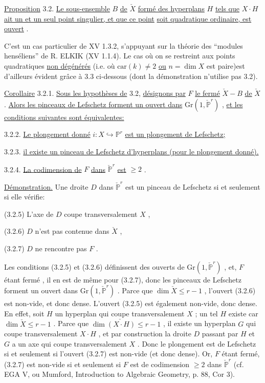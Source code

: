 \underline{Proposition} 3.2. \underline{Le sous-ensemble} $B$ \underline{de} $\check{X}$ \underline{formé des hyperplans} $H$ \underline{tels que} $X \cdot H$ \underline{ait un et un seul point singulier, et que ce point}
\underline{soit quadratique ordinaire, est ouvert} .

C'est un cas particulier de XV 1.3.2, s'appuyant sur la théorie des ``modules henséliens'' de R. ELKIK (XV 1.1.4). Le cas où on se restreint aux points quadratiques \underline{non dégénérés} (i.e. où $\mathrm{car}(k) \neq 2$ \underline{ou} $n=\dim X$ est paire)est d'ailleurs évident grâce à 3.3 ci-dessous (dont la démonstration n'utilise pas 3.2).

\underline{Corollaire} 3.2.1. \underline{Sous les hypothèses de} 3.2, \underline{désignons par} $F$ \underline{le fermé} $\check{X}-B$ \underline{de} $\check{X}$ . \underline{Alors les pinceaux de Lefschetz forment un ouvert dans} $\mathrm{Gr}(1, \check{\mathbb{P}}^r)$ , \underline{et les conditions suivantes sont équivalentes:}

3.2.2. \underline{Le plongement donné} $i : X \hookrightarrow \mathbb{P}^r$ \underline{est un plongement de Lefschetz;}

3.2.3. \underline{il existe un pinceau de Lefschetz d'hyperplans (pour le plongement donné).}

3.2.4. \underline{La codimension de} $F$ \underline{dans} $\check{\mathbb{P}}^r$ \underline{est} $\geq 2$ .

\underline{Démonstration.} Une droite $D$ dans $\check{\mathbb{P}}^r$ est un pinceau de Lefschetz si et seulement si elle vérifie:

(3.2.5) L'axe de $D$ coupe transversalement $X$ ,

(3.2.6) $D$ n'est pas contenue dans $\check{X}$ ,

(3.2.7) $D$ ne rencontre pas $F$ .



Les conditions (3.2.5) et (3.2.6) définissent des ouverts de $\mathrm{Gr}(1, \check{\mathbb{P}}^{r})$ , et, $F$ étant fermé , il en est de même pour (3.2.7), donc les pinceaux de Lefschetz forment un ouvert dans $\mathrm{Gr}(1, \check{\mathbb{P}}^{r})$ . Parce que $\dim \check{X} \leq r-1$ , l'ouvert (3.2.6) est non-vide, et donc dense. L'ouvert (3.2.5) est également non-vide, donc dense. En effet, soit $H$ un hyperplan qui coupe transversalement $X$ ; un tel $H$ existe car $\dim \check{X} \leq r-1$ . Parce que $\dim \check{(X \cdot H)} \leq r-1$ , il existe un hyperplan $G$ qui coupe transversalement $X \cdot H$ , et par construction la droite $D$ passant par $H$ et $G$ a un axe qui coupe transversalement $X$ . Donc le plongement est de Lefschetz si et seulement si l'ouvert (3.2.7) est non-vide (et donc dense). Or, $F$ étant fermé, (3.2.7) est non-vide si et seulement si $F$ est de codimension $\geq 2$ dans $\check{\mathbb{P}}^{r}$ (cf. EGA V, ou Mumford, Introduction to Algebraic Geometry, p. 88, Cor 3).


